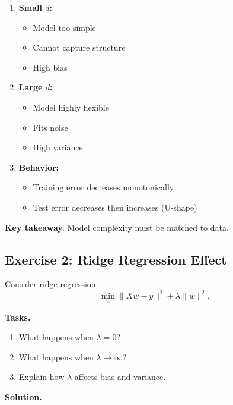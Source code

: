 \begin{enumerate}
\item \textbf{Small $d$:}
\begin{itemize}
    \item Model too simple
    \item Cannot capture structure
    \item High bias
\end{itemize}

\item \textbf{Large $d$:}
\begin{itemize}
    \item Model highly flexible
    \item Fits noise
    \item High variance
\end{itemize}

\item \textbf{Behavior:}
\begin{itemize}
    \item Training error decreases monotonically
    \item Test error decreases then increases (U-shape)
\end{itemize}
\end{enumerate}

\medskip

\noindent
\textbf{Key takeaway.}  
Model complexity must be matched to data.

\subsection{Exercise 2: Ridge Regression Effect}

Consider ridge regression:
\[
\min_w \|Xw - y\|^2 + \lambda \|w\|^2.
\]

\medskip

\noindent
\textbf{Tasks.}
\begin{enumerate}
    \item What happens when $\lambda = 0$?
    \item What happens when $\lambda \to \infty$?
    \item Explain how $\lambda$ affects bias and variance.
\end{enumerate}

\medskip

\noindent
\textbf{Solution.}

